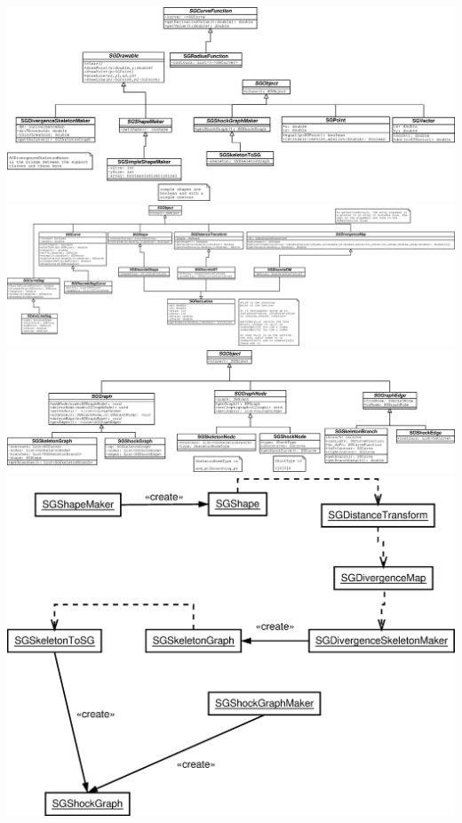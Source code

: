 \documentclass{article}
\begin{document}
	\includegraphics[width=9.5in,angle=90]{SG-MakerClasses.eps}
	\newpage
	\includegraphics[width=9.5in,angle=90]{SG-SupportClasses.eps}
	\newpage
	\includegraphics[width=9.5in,angle=90]{SG-GraphClasses.eps}
	\newpage
	\includegraphics[width=9.5in,angle=90]{SG-Flow.eps}
\end{document}
